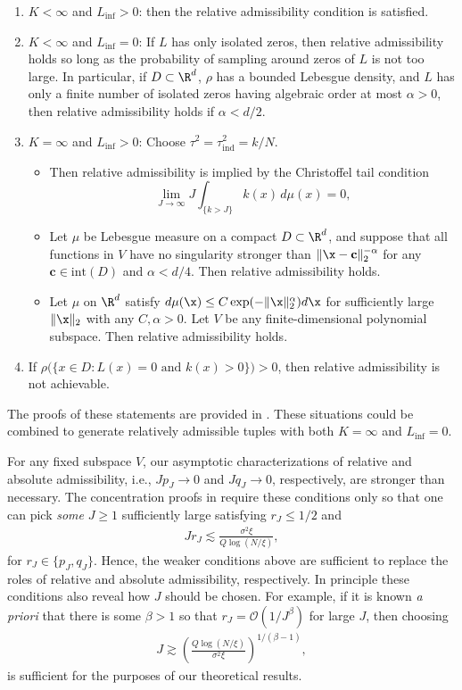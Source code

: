 \documentclass[10pt,dvipsnames]{amsart}
\begin{document}
\begin{enumerate}
  \item $K < \infty$ and $L_{\inf} > 0$: then the relative admissibility condition is satisfied.
  \item $K < \infty$ and $L_{\inf} = 0$: If $L$ has only isolated zeros, then relative admissibility holds so long as the probability of sampling around zeros of $L$ is not too large. In particular, if $D \subset \R^d$, $\rho$ has a bounded Lebesgue density, and $L$ has only a finite number of isolated zeros having algebraic order at most $\alpha > 0$, then relative admissibility holds if $\alpha < d/2$.
  \item $K = \infty$ and $L_{\inf} > 0$: Choose $\tau^2 = \tau^2_\mathrm{ind} =k/N$.
    \begin{itemize}
      \item Then relative admissibility is implied by the Christoffel tail condition
        \[
            \lim_{J\to\infty}
            J\int_{\{k>J\}} k(x)\,d\mu(x)
            =
            0,
        \]
      \item Let $\mu$ be Lebesgue measure on a compact $D \subset \R^d$, and suppose that all functions in $V$ have no singularity stronger than $\|\x - \mathbf{c}\|_2^{-\alpha}$ for any $\mathbf{c} \in \mathrm{int}(D)$ and $\alpha < d/4$. Then relative admissibility holds.
      \item Let $\mu$ on $\R^d$ satisfy $d \mu(\x) \leq C \exp(-\|\x\|_2^\alpha) d \x$ for sufficiently large $\|\x\|_2$ with any $C, \alpha > 0$. Let $V$ be any finite-dimensional polynomial subspace. Then relative admissibility holds.
    \end{itemize}
  \item If \(\rho\bigl(\{x\in D:L(x)=0 \textrm{ and } k(x)>0\}\bigr)>0\), then relative admissibility is not achievable.
\end{enumerate}
The proofs of these statements are provided in . These situations could be combined to generate relatively admissible tuples with both $K = \infty$ and $L_{\inf} = 0$.

For any fixed subspace $V$, our asymptotic characterizations of relative and absolute admissibility, i.e., $J p_J \rightarrow 0$ and $J q_J \rightarrow 0$, respectively, are stronger than necessary. The concentration proofs in  require these conditions only so that one can pick \textit{some} $J \geq 1$ sufficiently large satisfying $r_J \leq 1/2$ and
\begin{align*}
  J r_J \lesssim
  \frac{\sigma^2 \xi}{Q \log(N/\xi)},
\end{align*}
for $r_J \in \{p_J,q_J\}$.
Hence, the weaker conditions above are sufficient to replace the roles of relative and absolute admissibility, respectively. In principle these conditions also reveal how $J$ should be chosen. For example, if it is known \textit{a priori} that there is some $\beta > 1$ so that $r_J = \mathcal{O}(1/J^\beta)$ for large $J$, then choosing
\begin{align*}
  J \gtrsim \left( \frac{Q \log(N/\xi)}{\sigma^2 \xi} \right)^{1/(\beta-1)},
\end{align*}
is sufficient for the purposes of our theoretical results.
\end{document}
